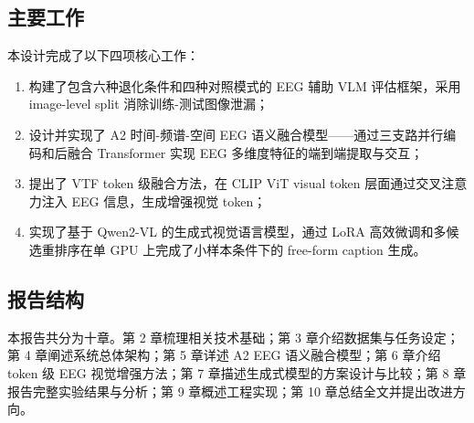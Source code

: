 \subsection{主要工作}

本设计完成了以下四项核心工作：

\begin{enumerate}
  \item 构建了包含六种退化条件和四种对照模式的 EEG 辅助 VLM 评估框架，采用 image-level split 消除训练-测试图像泄漏；
  \item 设计并实现了 A2 时间-频谱-空间 EEG 语义融合模型——通过三支路并行编码和后融合 Transformer 实现 EEG 多维度特征的端到端提取与交互；
  \item 提出了 VTF token 级融合方法，在 CLIP ViT visual token 层面通过交叉注意力注入 EEG 信息，生成增强视觉 token；
  \item 实现了基于 Qwen2-VL 的生成式视觉语言模型，通过 LoRA 高效微调和多候选重排序在单 GPU 上完成了小样本条件下的 free-form caption 生成。
\end{enumerate}

\subsection{报告结构}

本报告共分为十章。第 2 章梳理相关技术基础；第 3 章介绍数据集与任务设定；第 4 章阐述系统总体架构；第 5 章详述 A2 EEG 语义融合模型；第 6 章介绍 token 级 EEG 视觉增强方法；第 7 章描述生成式模型的方案设计与比较；第 8 章报告完整实验结果与分析；第 9 章概述工程实现；第 10 章总结全文并提出改进方向。
